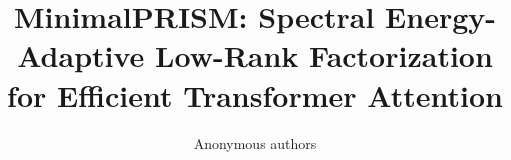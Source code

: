 \title{\textbf{MinimalPRISM: Spectral Energy-Adaptive Low-Rank Factorization for Efficient Transformer Attention}}

\author{Anonymous authors}
